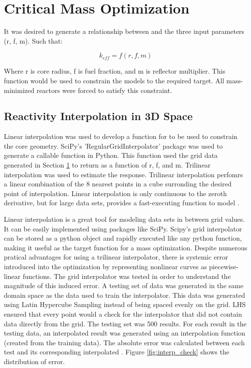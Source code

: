 \section{Critical Mass Optimization}\label{sec:crit_rad_search}
It was desired to generate a relationship between \keff and the three input
parameters (r, f, m). Such that:

\begin{equation}
    k_{eff} = f(r, f, m)
\label{eq:gen_keff}
\end{equation}

Where r is core radius, f is fuel fraction, and m is reflector multiplier. This
function would be used to constrain the models to the required \keff target. All
mass-minimized reactors were forced to satisfy this constraint.

\subsection{Reactivity Interpolation in 3D Space}
Linear interpolation was used to develop a function for \keff to be used to
constrain the core geometry. SciPy's 'RegularGridInterpolator' package was used
to generate a callable function in Python. This function used the grid data
generated in Section \ref{sec:crit_rad_search} to return \keff as a function of
r, f, and m. Trilinear interpolation was used to estimate the \keff response.
Trilinear interpolation perfomrs a linear combination of the 8 nearest points in
a cube surronding the desired point of interpolation. Linear interpolation is
only continuous to the zeroth derivative, but for large data sets, provides a
fast-executing function to model \keff.

Linear interpolation is a great tool for modeling data sets in between grid
values. It can be easily implemented using packages like SciPy. Scipy's grid
interpolator can be stored as a python object and rapidly executed like any
python function, making it useful as the target function for a mass
optimization. Despite numerous pratical advantages for using a trilinear
interpolator, there is systemic error introduced into the optimization by
representing nonlinear curves as piecewise-linear functions. The grid
interpolator was tested in order to understand the magnitude of this induced
error. A testing set of data was generated in the same domain space as the data
used to train the interpolator. This data was generated using Latin Hypercube
Sampling instead of being spaced evenly on the grid. LHS ensured that every
point would a check for the interpolator that did not contain data directly from
the grid. The testing set was 500 \keff results. For each \keff result in the
testing data, an interpolated result was generated using an interpolation
function (created from the training data). The absolute error was calculated
between each test \keff and its corresponding interpolated \keff. Figure
\ref{fig:interp_check} shows the distribution of error.

